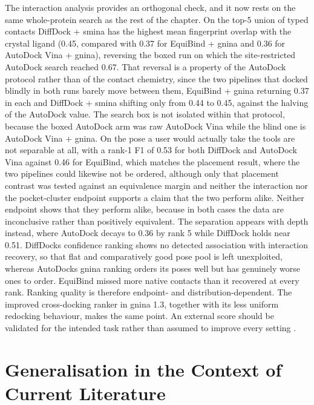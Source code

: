 The interaction analysis provides an orthogonal check, and it now rests on the same whole-protein search as the rest of the chapter. On the top-5 union of typed contacts DiffDock + smina has the highest mean fingerprint overlap with the crystal ligand (0.45, compared with 0.37 for EquiBind + gnina and 0.36 for AutoDock Vina + gnina), reversing the boxed run on which the site-restricted AutoDock search reached 0.67. That reversal is a property of the AutoDock protocol rather than of the contact chemistry, since the two pipelines that docked blindly in both runs barely move between them, EquiBind + gnina returning 0.37 in each and DiffDock + smina shifting only from 0.44 to 0.45, against the halving of the AutoDock value. The search box is not isolated within that protocol, because the boxed AutoDock arm was raw AutoDock Vina while the blind one is AutoDock Vina + gnina. On the pose a user would actually take the tools are not separable at all, with a rank-1 F1 of 0.53 for both DiffDock and AutoDock Vina against 0.46 for EquiBind, which matches the placement result, where the two pipelines could likewise not be ordered, although only that placement contrast was tested against an equivalence margin and neither the interaction nor the pocket-cluster endpoint supports a claim that the two perform alike. Neither endpoint shows that they perform alike, because in both cases the data are inconclusive rather than positively equivalent. The separation appears with depth instead, where AutoDock decays to 0.36 by rank 5 while DiffDock holds near 0.51. DiffDock\textquotesingle s confidence ranking shows no detected association with interaction recovery, so that flat and comparatively good pose pool is left unexploited, whereas AutoDock\textquotesingle s gnina ranking orders its poses well but has genuinely worse ones to order. EquiBind missed more native contacts than it recovered at every rank. Ranking quality is therefore endpoint- and distribution-dependent. The improved cross-docking ranker in gnina 1.3, together with its less uniform redocking behaviour, makes the same point. An external score should be validated for the intended task rather than assumed to improve every setting \cite{ref067}.

\hypertarget{generalisation-in-the-context-of-current-literature}{%
\section{Generalisation in the Context of Current Literature}\label{generalisation-in-the-context-of-current-literature}}


